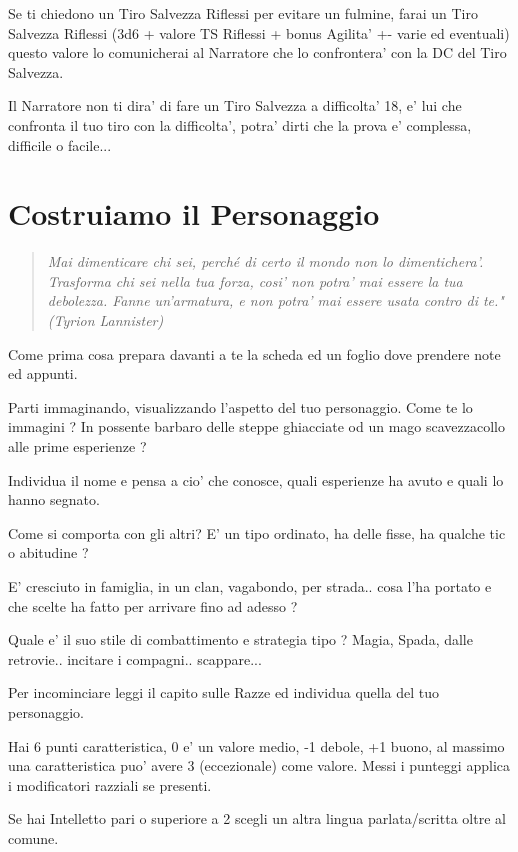 \documentclass[a4paper,11pt,twoside,openany]{book}
\begin{document}
Se ti chiedono un Tiro Salvezza Riflessi per evitare un fulmine, farai un Tiro Salvezza Riflessi (3d6 + valore TS Riflessi + bonus Agilita' +- varie ed eventuali) questo valore lo comunicherai al Narratore che lo confrontera' con la DC del Tiro Salvezza.

Il Narratore non ti dira' di fare un Tiro Salvezza a difficolta' 18, e' lui che confronta il tuo tiro con la difficolta', potra' dirti che la prova e' complessa, difficile o facile...


\pagebreak

\section{Costruiamo il Personaggio}

\label{costruiamo-il-personaggio}
\begin{quote}\textit{
Mai dimenticare chi sei, perché di certo il mondo non lo dimentichera'.
Trasforma chi sei nella tua forza, cosi' non potra' mai essere la tua
debolezza. Fanne un'armatura, e non potra' mai essere usata contro
di te." (Tyrion Lannister)
}\end{quote}
	
Come prima cosa prepara davanti a te la scheda ed un foglio dove prendere note ed appunti.

Parti immaginando, visualizzando l'aspetto del tuo personaggio. Come te lo immagini ? In possente barbaro delle steppe ghiacciate od un mago scavezzacollo alle prime esperienze ?

Individua il nome e pensa a cio' che conosce, quali esperienze ha avuto e quali lo hanno segnato.

Come si comporta con gli altri? E' un tipo ordinato, ha delle fisse, ha qualche tic o abitudine ?

E' cresciuto in famiglia, in un clan, vagabondo, per strada.. cosa l'ha portato e che scelte ha fatto per arrivare fino ad adesso ?

Quale e' il suo stile di combattimento e strategia tipo ? Magia, Spada, dalle retrovie.. incitare i compagni.. scappare...

Per incominciare leggi il capito sulle Razze ed individua quella del tuo personaggio.

Hai 6 punti caratteristica, 0 e' un valore medio, -1 debole, +1 buono, al massimo una caratteristica puo' avere 3 (eccezionale) come valore. Messi i punteggi applica i modificatori razziali se presenti.

Se hai Intelletto pari o superiore a 2 scegli un altra lingua parlata/scritta oltre al comune.
\end{document}
